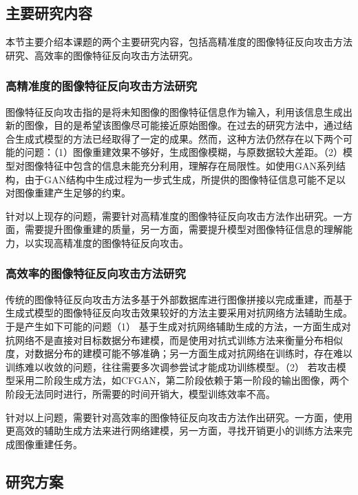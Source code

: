 \subsection{主要研究内容}
本节主要介绍本课题的两个主要研究内容，包括高精准度的图像特征反向攻击方法研究、高效率的图像特征反向攻击方法研究。
\subsubsection{高精准度的图像特征反向攻击方法研究}
图像特征反向攻击指的是将未知图像的图像特征信息作为输入，利用该信息生成出新的图像，目的是希望该图像尽可能接近原始图像。在过去的研究方法中，通过结合生成式模型的方法已经取得了一定的成果。然而，这种方法仍然存在以下两个可能的问题：（1）图像重建效果不够好，生成图像模糊，与原数据较大差距。（2）模型对图像特征中包含的信息未能充分利用，理解存在局限性。如使用GAN系列结构，由于GAN结构中生成过程为一步式生成，所提供的图像特征信息可能不足以对图像重建产生足够的约束。
\par
针对以上现存的问题，需要针对高精准度的图像特征反向攻击方法作出研究。一方面，需要提升图像重建的质量，另一方面，需要提升模型对图像特征信息的理解能力，以实现高精准度的图像特征反向攻击。

\subsubsection{高效率的图像特征反向攻击方法研究}
传统的图像特征反向攻击方法多基于外部数据库进行图像拼接以完成重建，而基于生成式模型的图像特征反向攻击效果较好的方法主要采用对抗网络方法辅助生成。于是产生如下可能的问题（1） 基于生成对抗网络辅助生成的方法，一方面生成对抗网络不是直接对目标数据分布建模，而是使用对抗式训练方法来衡量分布相似度，对数据分布的建模可能不够准确；另一方面生成对抗网络在训练时，存在难以训练难以收敛的问题，往往需要多次调参尝试才能成功训练模型。（2） 若攻击模型采用二阶段生成方法，如CFGAN，第二阶段依赖于第一阶段的输出图像，两个阶段无法同时进行，所需要的时间开销大，模型训练效率不高。
\par
针对以上问题，需要针对高效率的图像特征反向攻击方法作出研究。一方面，使用更高效的辅助生成方法来进行网络建模，另一方面，寻找开销更小的训练方法来完成图像重建任务。

\subsection{研究方案}
